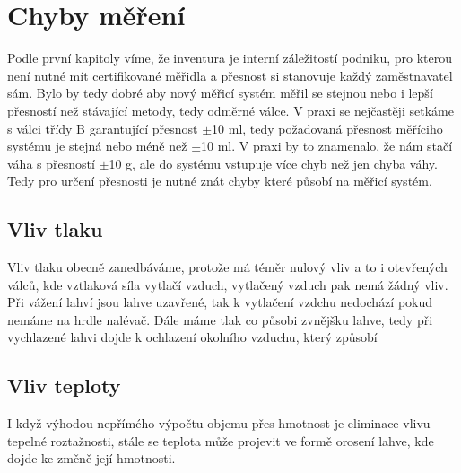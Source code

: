 

\section{Chyby měření}
\label{sec:chyby měření}
Podle první kapitoly víme, že inventura je interní záležitostí podniku, pro kterou není nutné mít certifikované měřidla a přesnost si stanovuje každý zaměstnavatel sám. Bylo by tedy dobré aby nový měřicí systém měřil se stejnou nebo i lepší přesností než stávající metody, tedy odměrné válce. V praxi se nejčastěji setkáme s válci třídy B garantující přesnost $\pm$10 ml, tedy požadovaná přesnost měříciho systému je stejná nebo méně než $\pm$10 ml. V praxi by to znamenalo, že nám stačí váha s přesností $\pm$10 g, ale do systému vstupuje více chyb než jen chyba váhy.
Tedy pro určení přesnosti je nutné znát chyby které působí na měřicí systém.
\subsection{Vliv tlaku}
Vliv tlaku obecně zanedbáváme, protože má téměr nulový vliv a to i otevřených válců, kde vztlaková síla vytlačí vzduch, vytlačený vzduch pak nemá žádný vliv. Při vážení lahví jsou lahve uzavřené, tak k vytlačení vzdchu nedochází pokud nemáme na hrdle nalévač. Dále máme tlak co působi zvnějšku lahve, tedy při vychlazené lahvi dojde k ochlazení okolního vzduchu, který způsobí 

\subsection{Vliv teploty}
\label{orosení}
I když výhodou nepřímého výpočtu objemu přes hmotnost je eliminace vlivu tepelné roztažnosti, stále se teplota může projevit ve formě orosení lahve, kde dojde ke změně její hmotnosti.

